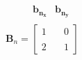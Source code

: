 \documentclass[preview]{standalone}
\begin{document}
\begin{align*}
\begin{array}{c}\begin{matrix}\hspace{1cm} \mathbf{b_{n_x}} & \mathbf{b_{n_y}} \end{matrix} \\  \mathbf{B}_n = \begin{bmatrix} 1 & \quad 0 \\ \\2 & \quad 1 \end{bmatrix} \end{array}
\end{align*}
\end{document}
